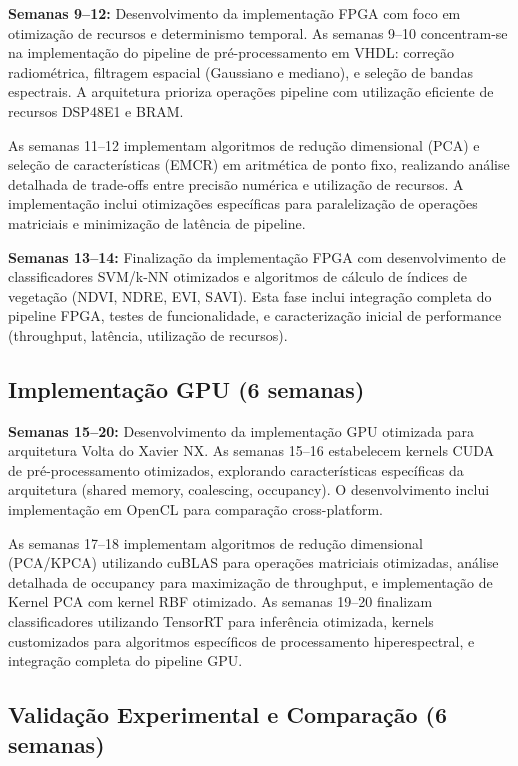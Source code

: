 \textbf{Semanas 9--12:} Desenvolvimento da implementação FPGA com foco 
em otimização de recursos e determinismo temporal. As semanas 9--10 concentram-se 
na implementação do pipeline de pré-processamento em VHDL: correção radiométrica, 
filtragem espacial (Gaussiano e mediano), e seleção de bandas espectrais. A 
arquitetura prioriza operações pipeline com utilização eficiente de recursos 
DSP48E1 e BRAM.

As semanas 11--12 implementam algoritmos de redução dimensional (PCA) e seleção 
de características (EMCR) em aritmética de ponto fixo, realizando análise 
detalhada de trade-offs entre precisão numérica e utilização de recursos. A 
implementação inclui otimizações específicas para paralelização de operações 
matriciais e minimização de latência de pipeline.

\textbf{Semanas 13--14:} Finalização da implementação FPGA com 
desenvolvimento de classificadores SVM/k-NN otimizados e algoritmos de cálculo 
de índices de vegetação (NDVI, NDRE, EVI, SAVI). Esta fase inclui integração 
completa do pipeline FPGA, testes de funcionalidade, e caracterização inicial 
de performance (throughput, latência, utilização de recursos).

\subsection{Implementação GPU (6 semanas)}\label{subsec:fase3_gpu}

\textbf{Semanas 15--20:} Desenvolvimento da implementação GPU 
otimizada para arquitetura Volta do Xavier NX. As semanas 15--16 estabelecem 
kernels CUDA de pré-processamento otimizados, explorando características 
específicas da arquitetura (shared memory, coalescing, occupancy). O desenvolvimento 
inclui implementação em OpenCL para comparação cross-platform.

As semanas 17--18 implementam algoritmos de redução dimensional (PCA/KPCA) 
utilizando cuBLAS para operações matriciais otimizadas, análise detalhada de 
occupancy para maximização de throughput, e implementação de Kernel PCA com 
kernel RBF otimizado. As semanas 19--20 finalizam classificadores utilizando 
TensorRT para inferência otimizada, kernels customizados para algoritmos 
específicos de processamento hiperespectral, e integração completa do pipeline GPU.

\subsection{Validação Experimental e Comparação (6 semanas)}\label{subsec:fase4_validacao}

